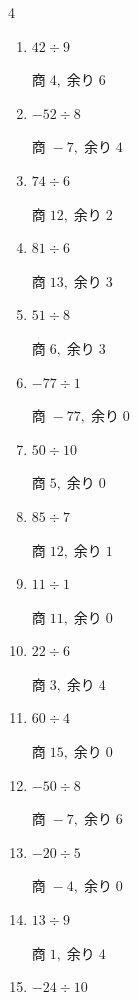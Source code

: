 \begin{multicols}{4}
\begin{enumerate}
  \item $42 \div 9$

        $商\; 4,\; 余り\; 6$

  \item $-52 \div 8$

        $商\; -7,\; 余り\; 4$

  \item $74 \div 6$

        $商\; 12,\; 余り\; 2$

  \item $81 \div 6$

        $商\; 13,\; 余り\; 3$

\columnbreak %

\resetques

  \item $51 \div 8$

        $商\; 6,\; 余り\; 3$

  \item $-77 \div 1$

        $商\; -77,\; 余り\; 0$

  \item $50 \div 10$

        $商\; 5,\; 余り\; 0$

  \item $85 \div 7$

        $商\; 12,\; 余り\; 1$

  \item $11 \div 1$

        $商\; 11,\; 余り\; 0$

  \item $22 \div 6$

        $商\; 3,\; 余り\; 4$

  \item $60 \div 4$

        $商\; 15,\; 余り\; 0$

  \item $-50 \div 8$

        $商\; -7,\; 余り\; 6$

  \item $-20 \div 5$

        $商\; -4,\; 余り\; 0$

  \item $13 \div 9$

        $商\; 1,\; 余り\; 4$

  \item $-24 \div 10$


\end{enumerate}
\end{multicols}
